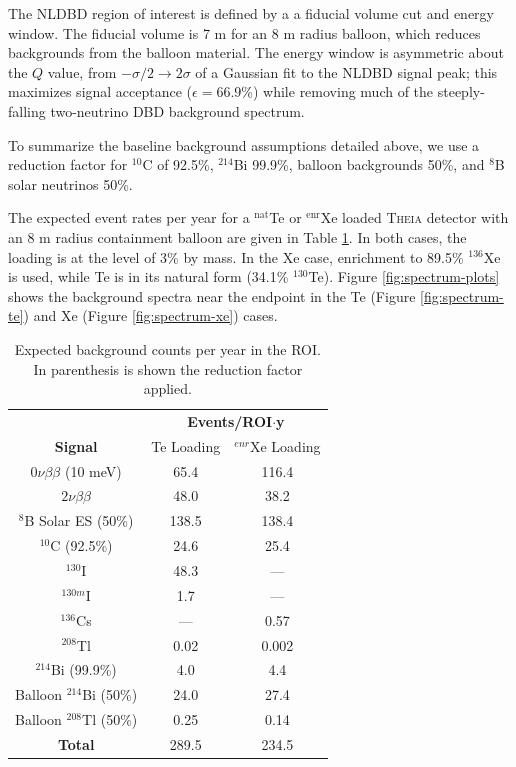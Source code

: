 The NLDBD region of interest is defined by a a fiducial volume cut and
energy window. The fiducial volume is 7 m for an 8 m radius balloon, which
reduces backgrounds from the balloon material. The energy window is asymmetric
about the $Q$ value, from $-\sigma/2 \to 2\sigma$ of a Gaussian fit to the
NLDBD signal peak; this maximizes signal acceptance ($\epsilon=66.9$\%)
while removing much of the steeply-falling two-neutrino DBD background
spectrum.

To summarize the baseline background assumptions detailed above,
we use a reduction
factor for $^{10}$C of 92.5\%, $^{214}$Bi 99.9\%, balloon backgrounds 50\%,
and $^8$B solar neutrinos 50\%.

The expected event rates per year for a $^\mathrm{nat}$Te or
$^\mathrm{enr}$Xe loaded \textsc{Theia}
detector with an 8 m radius containment balloon are given in Table
\ref{tab:counts}. In both cases, the loading is at the level of 3\% by mass.
In the Xe case, enrichment to 89.5\% $^{136}$Xe is used, while Te is in its
natural form (34.1\% $^{130}$Te). Figure \ref{fig:spectrum-plots} shows
the background spectra near the endpoint in the
Te (Figure \ref{fig:spectrum-te}) and Xe (Figure \ref{fig:spectrum-xe}) cases.

\begin{table}
\centering
\begin{tabular}{ccc}
\toprule
                          & \multicolumn{2}{c}{\bf Events/ROI$\cdot$y} \\
{\bf Signal}              & Te Loading & $^{enr}$Xe Loading \\
\midrule
$0\nu\beta\beta$ (10 meV) & 65.4       & 116.4      \\
\midrule
$2\nu\beta\beta$          & 48.0       & 38.2       \\
$^8$B Solar ES  (50\%)           & 138.5      & 138.4      \\
$^{10}$C  (92.5\%)                & 24.6       & 25.4       \\
$^{130}$I                 & 48.3       & ---        \\
$^{130m}$I                & 1.7        & ---        \\
$^{136}$Cs                & ---        & 0.57       \\
$^{208}$Tl                & 0.02       & 0.002      \\
$^{214}$Bi  (99.9\%)               & 4.0        & 4.4        \\
Balloon $^{214}$Bi  (50\%)       & 24.0       & 27.4       \\
Balloon $^{208}$Tl  (50\%)      & 0.25       & 0.14       \\
\midrule
{\bf Total}               & 289.5      & 234.5      \\
\bottomrule
\end{tabular}
\caption{Expected background counts per year in the ROI. In parenthesis is shown the reduction factor applied.}
\label{tab:counts}
\end{table}

